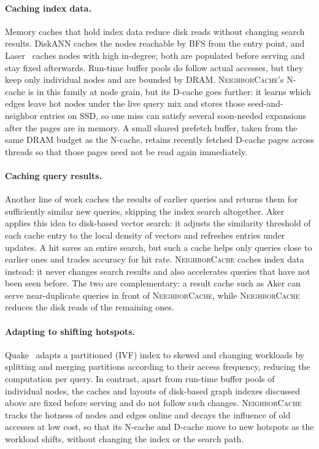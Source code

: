 \paragraph{Caching index data.}
Memory caches that hold index data reduce disk reads without changing search results.
DiskANN caches the nodes reachable by BFS from the entry point, and Laser~\cite{laser} caches nodes with high in-degree; both are populated before serving and stay fixed afterwards.
Run-time buffer pools do follow actual accesses, but they keep only individual nodes and are bounded by DRAM.
\textsc{NeighborCache}'s N-cache is in this family at node grain, but its D-cache goes further: it learns which edges leave hot nodes under the live query mix and stores those seed-and-neighbor entries on SSD, so one miss can satisfy several soon-needed expansions after the pages are in memory.
A small shared prefetch buffer, taken from the same DRAM budget as the N-cache, retains recently fetched D-cache pages across threads so that those pages need not be read again immediately.

\paragraph{Caching query results.}
Another line of work caches the results of earlier queries and returns them for sufficiently similar new queries, skipping the index search altogether.
Aker~\cite{aker} applies this idea to disk-based vector search: it adjusts the similarity threshold of each cache entry to the local density of vectors and refreshes entries under updates.
A hit saves an entire search, but such a cache helps only queries close to earlier ones and trades accuracy for hit rate.
\textsc{NeighborCache} caches index data instead: it never changes search results and also accelerates queries that have not been seen before.
The two are complementary: a result cache such as Aker can serve near-duplicate queries in front of \textsc{NeighborCache}, while \textsc{NeighborCache} reduces the disk reads of the remaining ones.

\paragraph{Adapting to shifting hotspots.}
Quake~\cite{quake} adapts a partitioned (IVF) index to skewed and changing workloads by splitting and merging partitions according to their access frequency, reducing the computation per query.
In contrast, apart from run-time buffer pools of individual nodes, the caches and layouts of disk-based graph indexes discussed above are fixed before serving and do not follow such changes.
\textsc{NeighborCache} tracks the hotness of nodes and edges online and decays the influence of old accesses at low cost, so that its N-cache and D-cache move to new hotspots as the workload shifts, without changing the index or the search path.
